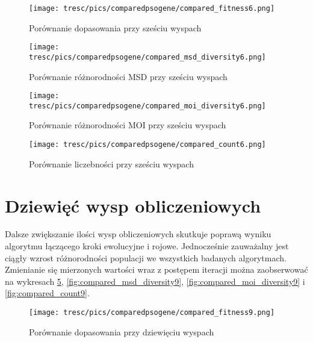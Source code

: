 \clearpage

\begin{figure}[H]
\begin{center} 
\texttt{[image: tresc/pics/comparedpsogene/compared\_fitness6.png]}
\caption{Porównanie dopasowania przy sześciu wyspach}
\label{fig:compared_fintess6}
\end{center}
\end{figure}


\begin{figure}[H]
\begin{center} 
\texttt{[image: tresc/pics/comparedpsogene/compared\_msd\_diversity6.png]}
\caption{Porównanie różnorodności MSD przy sześciu wyspach}
\label{fig:compared_msd_diversity6}
\end{center}
\end{figure}

\begin{figure}[H]
\begin{center} 
\texttt{[image: tresc/pics/comparedpsogene/compared\_moi\_diversity6.png]}
\caption{Porównanie różnorodności MOI przy sześciu wyspach}
\label{fig:compared_moi_diversity6}
\end{center}
\end{figure}

\begin{figure}[H]
\begin{center} 
\texttt{[image: tresc/pics/comparedpsogene/compared\_count6.png]}
\caption{Porównanie liczebności przy sześciu wyspach}
\label{fig:compared_count6}
\end{center}
\end{figure}


\section{Dziewięć wysp obliczeniowych}

Dalsze zwiększanie ilości wysp obliczeniowych skutkuje poprawą wyniku algorytmu łączącego kroki ewolucyjne i rojowe. Jednocześnie zauważalny jest ciągły wzrost różnorodności populacji we wszystkich badanych algorytmach. Zmienianie się mierzonych wartości wraz z postępem iteracji można zaobserwować na wykresach \ref{fig:compared_fintess9}, \ref{fig:compared_msd_diversity9}, \ref{fig:compared_moi_diversity9} i \ref{fig:compared_count9}.





\begin{figure}[H]
\begin{center} 
\texttt{[image: tresc/pics/comparedpsogene/compared\_fitness9.png]}
\caption{Porównanie dopasowania przy dziewięciu wyspach}
\label{fig:compared_fintess9}
\end{center}
\end{figure}

